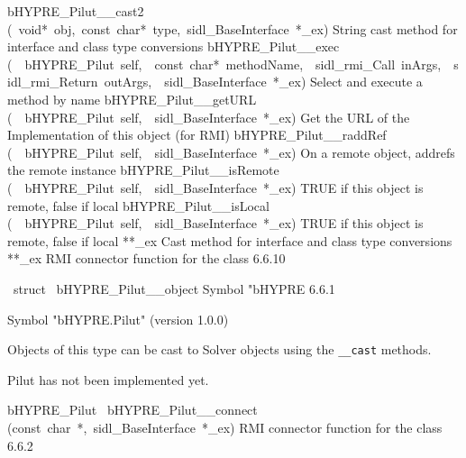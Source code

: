 \documentclass{article}
\begin{document}
\begin{cxxentry}
\begin{cxxentry}
\begin{cxxnames}
        {}
\label{cxx.6.6.29}
        {bHYPRE\_Pilut\_\_cast2}
        {(\ void*\ obj,\ const\ char*\ type,\ sidl\_BaseInterface\ *\_ex)}
        {
String cast method for interface and class type conversions}
        {}
\label{cxx.6.6.30}
        {bHYPRE\_Pilut\_\_exec}
        {(\ \ bHYPRE\_Pilut\ self,\ \ const\ char*\ methodName,\ \ sidl\_rmi\_Call\ inArgs,\ \ sidl\_rmi\_Return\ outArgs,\ \ sidl\_BaseInterface\ *\_ex)}
        {
Select and execute a method by name}
        {}
\label{cxx.6.6.31}
        {bHYPRE\_Pilut\_\_getURL}
        {(\ \ bHYPRE\_Pilut\ self,\ \ sidl\_BaseInterface\ *\_ex)}
        {
Get the URL of the Implementation of this object (for RMI)}
        {}
\label{cxx.6.6.32}
        {bHYPRE\_Pilut\_\_raddRef}
        {(\ \ bHYPRE\_Pilut\ self,\ \ sidl\_BaseInterface\ *\_ex)}
        {
On a remote object, addrefs the remote instance}
        {}
\label{cxx.6.6.33}
        {bHYPRE\_Pilut\_\_isRemote}
        {(\ \ bHYPRE\_Pilut\ self,\ \ sidl\_BaseInterface\ *\_ex)}
        {
TRUE if this object is remote, false if local}
        {}
\label{cxx.6.6.34}
        {bHYPRE\_Pilut\_\_isLocal}
        {(\ \ bHYPRE\_Pilut\ self,\ \ sidl\_BaseInterface\ *\_ex)}
        {
TRUE if this object is remote, false if local}
        {}
\label{cxx.6.6.35}
        {**\_ex}
        {}
        {
Cast method for interface and class type conversions}
        {}
\label{cxx.6.6.36}
        {**\_ex}
        {}
        {
RMI connector function for the class}
        {6.6.10}
\end{cxxnames}
\begin{cxxvariable}
{\ struct\ }
        {bHYPRE\_Pilut\_\_object}
        {}
        {
Symbol "bHYPRE}
        {6.6.1}
\begin{cxxdoc}

Symbol "bHYPRE.Pilut" (version 1.0.0)

Objects of this type can be cast to Solver objects using the
{\tt \_\_cast} methods.

Pilut has not been implemented yet.
\end{cxxdoc}
\end{cxxvariable}
\begin{cxxfunction}
{bHYPRE\_Pilut\ }
        {bHYPRE\_Pilut\_\_connect}
        {(const\ char\ *,\ sidl\_BaseInterface\ *\_ex)}
        {
RMI connector function for the class}
        {6.6.2}
\begin{cxxdoc}


\end{cxxdoc}
\end{cxxfunction}
\end{cxxentry}
\end{cxxentry}
\end{document}
